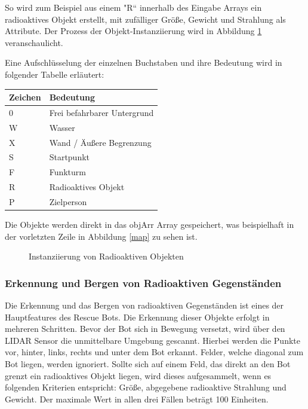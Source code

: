 So wird zum Beispiel aus einem "R“ innerhalb des Eingabe Arrays ein radioaktives Objekt erstellt, mit zufälliger Größe, Gewicht und Strahlung als Attribute. Der Prozess der Objekt-Instanziierung wird in Abbildung \ref{rad} veranschaulicht. 

Eine Aufschlüsselung der einzelnen Buchstaben und ihre Bedeutung wird in folgender Tabelle erläutert:
\begin{table}[H]
\centering
\begin{tabular}{l|l}
Zeichen & Bedeutung                 \\ 
\hline
0       & Frei befahrbarer Untergrund             \\
W       & Wasser                    \\
X       & Wand / Äußere Begrenzung  \\
S       & Startpunkt                \\
F       & Funkturm                  \\
R       & Radioaktives Objekt       \\
P       & Zielperson  
\label{buchstaben}
\end{tabular}
\end{table}

Die Objekte werden direkt in das objArr Array gespeichert, was beispielhaft in der vorletzten Zeile in Abbildung \ref{map} zu sehen ist. 


\begin{figure}[H]
  \caption{Instanziierung von Radioaktiven Objekten}
  \label{rad}
\end{figure}

\subsubsection{Erkennung und Bergen von Radioaktiven Gegenständen}
\label{erk}
Die Erkennung und das Bergen von radioaktiven Gegenständen ist eines der Hauptfeatures des Rescue Bots. Die Erkennung dieser Objekte erfolgt in mehreren Schritten. Bevor der Bot sich in Bewegung versetzt, wird über den LIDAR Sensor die unmittelbare Umgebung gescannt. Hierbei werden die Punkte vor, hinter, links, rechts und unter dem Bot erkannt. Felder, welche diagonal zum Bot liegen, werden ignoriert. Sollte sich auf einem Feld, das direkt an den Bot grenzt ein radioaktives Objekt liegen, wird dieses aufgesammelt, wenn es folgenden Kriterien entspricht: Größe, abgegebene radioaktive Strahlung und Gewicht. Der maximale Wert in allen drei Fällen beträgt 100 Einheiten.

